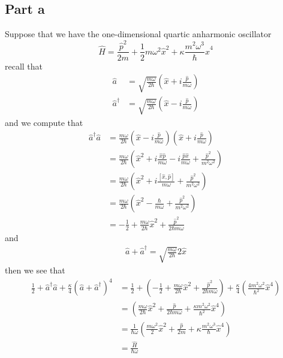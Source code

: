 \documentclass[12pt]{report}
\begin{document}
\subsection*{Part a}
Suppose that we have the one-dimensional quartic anharmonic oscillator
\begin{equation*}
  \hat{H} = \frac{\hat{p}^2}{2m} + \frac{1}{2}m\omega^2 \hat{x}^2 + \kappa \frac{m^2 \omega^3}{\hbar} \hat{x}^4
\end{equation*}
recall that 
\begin{align*}
  \hat{a} &= \sqrt{\frac{m\omega}{2\hbar}}\left(\hat{x} + i \frac{\hat{p}}{m\omega}\right) \\
  \hat{a}^\dagger &= \sqrt{\frac{m\omega}{2\hbar}}\left(\hat{x} - i \frac{\hat{p}}{m\omega}\right)
\end{align*}
and we compute that
\begin{align*}
\hat{a}^\dagger \hat{a} &= \frac{m \omega}{2\hbar}\left(\hat{x} - i \frac{\hat{p}}{m\omega}\right)\left(\hat{x} + i \frac{\hat{p}}{m\omega}\right) \\
                        &= \frac{m \omega}{2\hbar}\left(\hat{x}^2 + i\frac{\hat{x} \hat{p}}{m\omega} - i \frac{\hat{p}{\hat{x}}}{m \omega} + \frac{\hat{p}^2}{m^2 \omega^2}\right) \\
                        &= \frac{m\omega}{2\hbar} \left(\hat{x}^2 + i \frac{[\hat{x},\hat{p}]}{m\omega} + \frac{\hat{p}^2}{m^2 \omega^2}\right) \\
                        &= \frac{m\omega}{2\hbar} \left(\hat{x}^2 - \frac{\hbar}{m\omega} + \frac{\hat{p}^2}{m^2 \omega^2}\right) \\
                        &= -\frac{1}{2} + \frac{m \omega}{2\hbar} \hat{x}^2 + \frac{\hat{p}^2}{2\hbar m\omega}
\end{align*}
and
\begin{align*}
  \hat{a} + \hat{a}^\dagger = \sqrt{\frac{m \omega}{2\hbar}} 2\hat{x}
\end{align*}
then we see that
\begin{align*}
  \frac{1}{2} + \hat{a}^\dagger \hat{a} + \frac{\kappa}{4}(\hat{a} + \hat{a}^\dagger)^4 &=  \frac{1}{2} + \left(-\frac{1}{2} + \frac{m \omega}{2\hbar} \hat{x}^2 + \frac{\hat{p}^2}{2\hbar m\omega}\right) + \frac{\kappa}{4}\left( \frac{4 m^2 \omega^2}{\hbar^2} \hat{x}^4 \right) \\
                                                                                        &= \left(\frac{m\omega}{2\hbar} \hat{x}^2 + \frac{\hat{p}}{2\hbar m \omega} + \frac{\kappa m^2 \omega^2}{\hbar^2} \hat{x}^4\right) \\
                                                                                        &= \frac{1}{\hbar \omega} \left(\frac{m\omega^2}{2} \hat{x}^2 + \frac{\hat{p}}{2m} + \kappa \frac{m^2 \omega^3}{\hbar} \hat{x}^4\right) \\
                                                                                        &= \frac{\hat{H}}{\hbar \omega} 
\end{align*}
\end{document}
